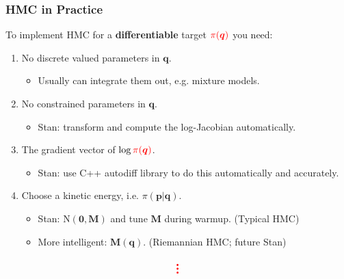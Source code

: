 \documentclass[xcolor=dvipsnames]{beamer}
\begin{document}
\begin{frame}[fragile]
\frametitle{HMC in Practice}
To implement HMC for a \textbf{differentiable} target ${\color{red}\pi(\bm{q})}$ you need:
\vspace{0.2cm}
\begin{enumerate}
\item No discrete valued parameters in $\bm{q}$.
\begin{itemize}
\item Usually can integrate them out, e.g. mixture models.
\end{itemize}
\vspace{0.2cm}
\item No constrained parameters in $\bm{q}$.
\begin{itemize}
\item Stan: transform and compute the log-Jacobian automatically.
\end{itemize}
\vspace{0.2cm}
\item The gradient vector of $\log {\color{red}\pi(\bm{q})}$.
\begin{itemize}
\item Stan: use C++ autodiff library to do this automatically and accurately.
\end{itemize}
\vspace{0.2cm}
\item Choose a kinetic energy, i.e. $\pi(\bm{p}|\bm{q})$.
\begin{itemize}
\item Stan: $\mathrm{N}(\bm{0}, \bm{M})$ and tune $\bm{M}$ during warmup. (Typical HMC)
\item More intelligent: $\bm{M}(\bm{q})$. (Riemannian HMC; future Stan)
\end{itemize}
\end{enumerate}
\begin{align*}
{\color{red}\Huge{\vdots}}
\end{align*}
\end{frame}
\end{document}
